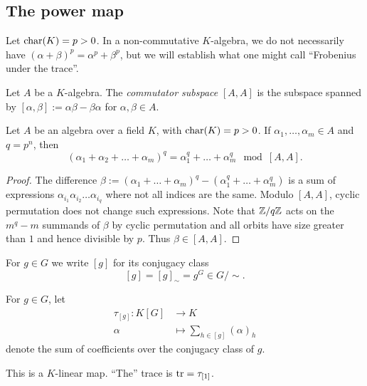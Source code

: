 \subsection{The power map}

Let $\mathrm{char}(K) = p > 0$.
In a non-commutative $K$-algebra, we do not necessarily have $(\alpha + \beta)^p = \alpha^p + \beta^p$, but we will establish what one might call ``Frobenius under the trace''.

\begin{definition}
    Let $A$ be a $K$-algebra.
    The \emph{commutator subspace} $[A, A]$ is the subspace spanned by $[\alpha, \beta] := \alpha \beta - \beta \alpha$ for $\alpha, \beta \in A$.
\end{definition}

\begin{lemma}
    \label{lemma:frobenius_mod_commutators}
    Let $A$ be an algebra over a field $K$, with $\mathrm{char}(K) = p > 0$.
    If $\alpha_1, \dots, \alpha_m \in A$ and $q = p^n$, then \[
        (\alpha_1 + \alpha_2 + \dots + \alpha_m)^q = \alpha_1^q + \dots + \alpha_m^q \mod [A, A].
    \]
\end{lemma}

\begin{proof}
    The difference $\beta := (\alpha_1 + \dots + \alpha_m)^q - (\alpha_1^q + \dots + \alpha_m^q)$ is a sum of expressions $\alpha_{i_1} \alpha_{i_2} \dots \alpha_{i_q}$ where not all indices are the same.
    Modulo $[A, A]$, cyclic permutation does not change such expressions.
    Note that $\mathbb{Z} / q\mathbb{Z}$ acts on the $m^q - m$ summands of $\beta$ by cyclic permutation and all orbits have size greater than $1$ and hence divisible by $p$.
    Thus $\beta \in [A, A]$.
\end{proof}

For $g \in G$ we write $[g]$ for its conjugacy class \[
    [g] = [g]_\sim = g^G \in G / {\sim}.
\]

\begin{definition}
    For $g \in G$, let
    \begin{align*}
        \tau_{[g]} \colon K[G] &\to K \\
                        \alpha &\mapsto \sum_{h \in [g]} (\alpha)_h
    \end{align*}
    denote the sum of coefficients over the conjugacy class of $g$.
\end{definition}

This is a $K$-linear map. ``The'' trace is $\operatorname{tr} = \tau_{[1]}$.


